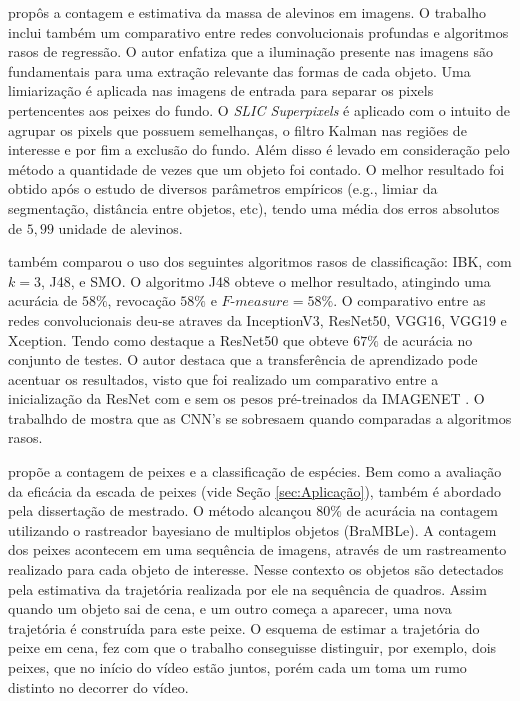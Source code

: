 \cite{Junior2019UFMS} propôs a contagem e estimativa da massa de alevinos em imagens. O trabalho inclui também um comparativo entre redes convolucionais profundas e algoritmos rasos de regressão.
O autor enfatiza que a iluminação presente nas imagens são fundamentais para uma extração relevante das formas de cada objeto.
Uma limiarização é aplicada nas imagens de entrada para separar os pixels pertencentes aos peixes do fundo.
O \textit{SLIC Superpixels} \cite{SLIC} é aplicado com o intuito de agrupar os pixels que possuem semelhanças, o filtro Kalman \cite{Kalman} nas regiões de interesse e por fim a exclusão do fundo. Além disso é levado em consideração pelo método a quantidade de vezes que um objeto foi contado.
O melhor resultado foi obtido após o estudo de diversos parâmetros empíricos (e.g., limiar da segmentação, distância entre objetos, etc), tendo uma média dos erros absolutos de $5,99$ unidade de alevinos.

\cite{Junior2019UFMS} também comparou o uso dos seguintes algoritmos rasos de classificação: IBK, com $k = 3$, J48, e SMO. O algoritmo J48 obteve o melhor resultado, atingindo uma acurácia de $58\%$, revocação
$58\%$ e $\textit{F-measure} = 58\%$. O comparativo entre as redes convolucionais deu-se atraves da InceptionV3, ResNet50, VGG16, VGG19 e Xception. Tendo como destaque a ResNet50 \cite{ResNet50} que obteve $67\%$ de acurácia no conjunto de testes.
O autor destaca que a transferência de aprendizado pode acentuar os resultados, visto que foi realizado um comparativo entre a inicialização da ResNet com e sem os pesos pré-treinados da IMAGENET \cite{IMAGENET}. O trabalhdo de \cite{Junior2019UFMS} mostra que as CNN's se sobresaem quando comparadas a algoritmos rasos.


\cite{Erikson} propõe a contagem de peixes e a classificação de espécies.
Bem como a avaliação da eficácia da escada de peixes (vide Seção \ref{sec:Aplicação}), também é abordado pela dissertação de mestrado.
O método alcançou $80\%$ de acurácia na contagem utilizando o rastreador bayesiano de multiplos objetos (BraMBLe).
A contagem dos peixes acontecem em uma sequência de imagens, através de um rastreamento realizado para cada objeto de interesse. Nesse contexto os objetos são detectados pela estimativa da trajetória realizada por ele na sequência de quadros. Assim quando um objeto sai de cena, e um outro começa a aparecer, uma nova trajetória é construída para este peixe. O esquema de estimar a trajetória do peixe em cena, fez com que o trabalho conseguisse distinguir, por exemplo, dois peixes, que no início do vídeo estão juntos, porém cada um toma um rumo distinto no decorrer do vídeo.

